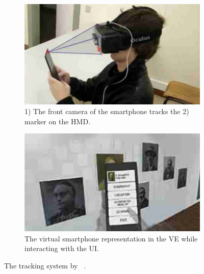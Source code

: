\begin{figure}[H]
  \centering
  \begin{subfigure}{0.4\textwidth}%
    \includegraphics[width=\textwidth]{figures/related_work/dias_2018_tracking.png}
    \caption{1) The front camera of the smartphone tracks the 2) marker on the \ac{HMD}.}\label{fig:dias-2018-tracking}%
  \end{subfigure}%
  \hspace{0.1\textwidth}%
  \begin{subfigure}{0.4\textwidth}%
    \includegraphics[width=\textwidth]{figures/related_work/dias_2018_virtual_smartphone.png}
    \caption{The virtual smartphone representation in the \ac{VE} while interacting with the \ac{UI}.}\label{fig:dias-2018-virtual-smartphone}
  \end{subfigure}%
  \caption[Tracking setup by Dias et al.]{The tracking system by \citeauthor{Dias.2018}~\protect\cite[4,5]{Dias.2018}.}\label{fig:dias-2018}
\end{figure}


